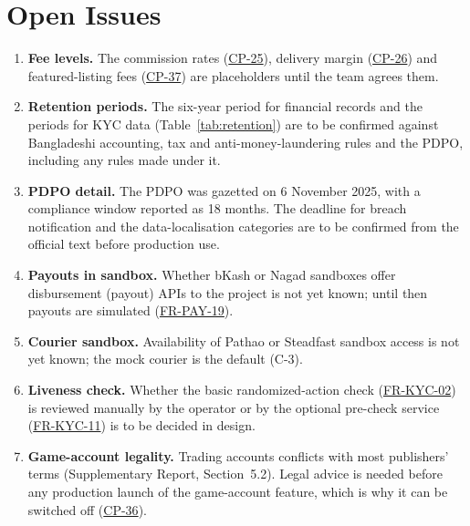 \documentclass[11pt,a4paper]{report}
\newcommand{\rr}[1]{\hyperlink{#1}{#1}}
\newcommand{\cp}[1]{\hyperlink{#1}{#1}}
\begin{document}
\chapter{Open Issues}
\label{app:open}
\begin{enumerate}[label=\textbf{OI-\arabic*}, leftmargin=*]
    \item \textbf{Fee levels.} The commission rates (\cp{CP-25}), delivery margin (\cp{CP-26}) and featured-listing fees (\cp{CP-37}) are placeholders until the team agrees them.
    \item \textbf{Retention periods.} The six-year period for financial records and the periods for KYC data (Table~\ref{tab:retention}) are to be confirmed against Bangladeshi accounting, tax and anti-money-laundering rules and the PDPO, including any rules made under it.
    \item \textbf{PDPO detail.} The PDPO was gazetted on 6 November 2025, with a compliance window reported as 18 months. The deadline for breach notification and the data-localisation categories are to be confirmed from the official text before production use.
    \item \textbf{Payouts in sandbox.} Whether bKash or Nagad sandboxes offer disbursement (payout) APIs to the project is not yet known; until then payouts are simulated (\rr{FR-PAY-19}).
    \item \textbf{Courier sandbox.} Availability of Pathao or Steadfast sandbox access is not yet known; the mock courier is the default (C-3).
    \item \textbf{Liveness check.} Whether the basic randomized-action check (\rr{FR-KYC-02}) is reviewed manually by the operator or by the optional pre-check service (\rr{FR-KYC-11}) is to be decided in design.
    \item \textbf{Game-account legality.} Trading accounts conflicts with most publishers' terms (Supplementary Report, Section~5.2). Legal advice is needed before any production launch of the game-account feature, which is why it can be switched off (\cp{CP-36}).
\end{enumerate}
\end{document}
